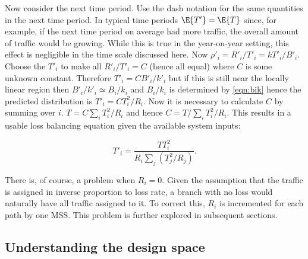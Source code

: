 Now consider the next time period.  
Use the dash notation for the same quantities in the next time period.  
In typical time periods $\E{T'} = \E{T}$ since, for example, if the next time period on average had more traffic, the overall amount of traffic would be growing. 
While this is true in the year-on-year setting, this effect is negligible in the time scale discussed here.
Now $\rho'_i = R'_i/T'_i = k T'_i/B'_i$.  
Choose the $T'_i$ to make all $R'_i/T'_i = C$ (hence all equal) where $C$ is some unknown constant.  
Therefore $T'_i = C B'_i/k'_i$ but if this is still near the locally linear region then $B'_i/k'_i \simeq B_i/k_i$ and $B_i/k_i$ is determined by \eqref{eqn:bik} hence the predicted distribution is $ T'_i = C T_i^2/R_i$.  
Now it is necessary to calculate $C$ by summing over $i$.  
$T = C \sum_i T_i^2/R_i$ and hence $C = T/\sum_i T_i^2/R_i$.
This results in a usable loss balancing equation given the available system inputs:

\begin{equation}
T'_i = \frac{T T_i^2}{R_i \sum_j (T_j^2/R_j)}.
\label{eqn:routesplitloss}
\end{equation}

There is, of course, a problem when $R_i = 0$.  
Given the assumption that the traffic is assigned in inverse proportion to loss rate, a branch with no loss would naturally have all traffic assigned to it. 
To correct this, $R_i$ is incremented for each path by one \ac{MSS}. 
This problem is further explored in subsequent sections.

\subsection{Understanding the design space}

